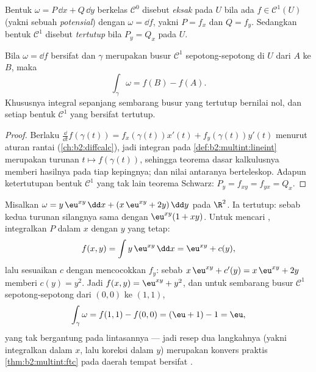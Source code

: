 \begin{definition}\label{def:b2:multint:exact}
Bentuk $\omega = P\,\dd x + Q\,\dd y$ berkelas $\mathcal{C}^0$
disebut \emph{eksak} pada $U$ bila ada $f \in \mathcal{C}^1(U)$
(yakni sebuah \emph{potensial}) dengan $\omega = \dd f$, yakni $P = f_x$ dan $Q
= f_y$. Sedangkan bentuk $\mathcal{C}^1$ disebut \emph{tertutup} bila $P_y = Q_x$ pada
$U$.
\end{definition}

\begin{theorem}\label{thm:b2:multint:ftc}
Bila $\omega = \dd f$ bersifat  dan $\gamma$ merupakan busur
$\mathcal{C}^1$ sepotong-sepotong di $U$ dari $A$ ke $B$, maka
\[
\int_\gamma \omega = f(B) - f(A) .
\]
Khususnya integral  sepanjang sembarang busur yang tertutup
bernilai nol, dan setiap bentuk $\mathcal{C}^1$ yang  bersifat tertutup.
\end{theorem}

\begin{proof}
Berlaku $\frac{\dd}{\dd t}f(\gamma(t)) = f_x(\gamma(t))x'(t) +
f_y(\gamma(t))y'(t)$ menurut aturan rantai
(\cref{ch:b2:diffcalc}), jadi integran pada
\cref{def:b2:multint:lineint} merupakan turunan $t \mapsto
f(\gamma(t))$, sehingga teorema dasar kalkulusnya memberi
hasilnya pada tiap kepingnya; dan nilai antaranya berteleskop. Adapun ketertutupan
bentuk $\mathcal{C}^1$ yang  tak lain teorema Schwarz: $P_y =
f_{xy} = f_{yx} = Q_x$.
\end{proof}

\begin{example}\label{ex:b2:multint:potential}
Misalkan $\omega = y\,\eu^{xy}\,\dd x + (x\,\eu^{xy} + 2y)\,\dd y$
pada $\R^2$. Ia tertutup: sebab kedua turunan silangnya sama dengan
$\eu^{xy}(1 + xy)$. Untuk mencari , integralkan $P$ dalam
$x$ dengan $y$ yang tetap:
\[
f(x, y) = \int y\,\eu^{xy}\,\dd x = \eu^{xy} + c(y),
\]
lalu sesuaikan $c$ dengan mencocokkan $f_y$: sebab $x\,\eu^{xy} + c'(y) =
x\,\eu^{xy} + 2y$ memberi $c(y) = y^2$. Jadi $f(x,y) = \eu^{xy} +
y^2$, dan untuk sembarang busur $\mathcal C^1$ sepotong-sepotong dari $(0,0)$
ke $(1,1)$,
\[
\int_\gamma\omega = f(1,1) - f(0,0) = (\eu + 1) - 1 = \eu ,
\]
yang tak bergantung pada lintasannya --- jadi resep dua langkahnya (yakni integralkan
dalam $x$, lalu koreksi dalam $y$) merupakan konvers praktis
\cref{thm:b2:multint:ftc} pada daerah tempat 
bersifat .
\end{example}

